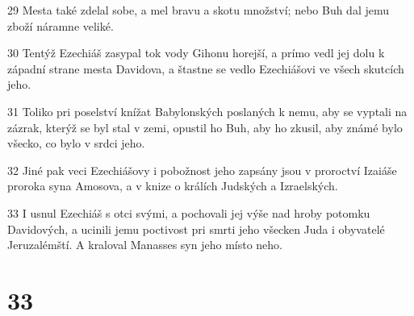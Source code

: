 \par 29 Mesta také zdelal sobe, a mel bravu a skotu množství; nebo Buh dal jemu zboží náramne veliké.
\par 30 Tentýž Ezechiáš zasypal tok vody Gihonu horejší, a prímo vedl jej dolu k západní strane mesta Davidova, a štastne se vedlo Ezechiášovi ve všech skutcích jeho.
\par 31 Toliko pri poselství knížat Babylonských poslaných k nemu, aby se vyptali na zázrak, kterýž se byl stal v zemi, opustil ho Buh, aby ho zkusil, aby známé bylo všecko, co bylo v srdci jeho.
\par 32 Jiné pak veci Ezechiášovy i pobožnost jeho zapsány jsou v proroctví Izaiáše proroka syna Amosova, a v knize o králích Judských a Izraelských.
\par 33 I usnul Ezechiáš s otci svými, a pochovali jej výše nad hroby potomku Davidových, a ucinili jemu poctivost pri smrti jeho všecken Juda i obyvatelé Jeruzalémští. A kraloval Manasses syn jeho místo neho.

\chapter{33}

